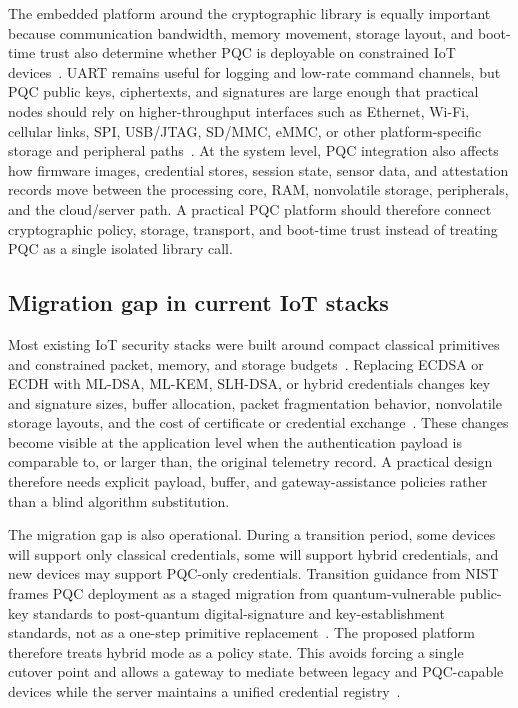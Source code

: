 \documentclass[conference,10pt,letterpaper]{IEEEtran}
\begin{document}
The embedded platform around the cryptographic library is equally important because communication bandwidth, memory movement, storage layout, and boot-time trust also determine whether PQC is deployable on constrained IoT devices~\cite{roma2021,liu2018,schoeffel2021}. UART remains useful for logging and low-rate command channels, but PQC public keys, ciphertexts, and signatures are large enough that practical nodes should rely on higher-throughput interfaces such as Ethernet, Wi-Fi, cellular links, SPI, USB/JTAG, SD/MMC, eMMC, or other platform-specific storage and peripheral paths~\cite{carril2024,mao2023,karl2025,fips203,fips204,fips205}. At the system level, PQC integration also affects how firmware images, credential stores, session state, sensor data, and attestation records move between the processing core, RAM, nonvolatile storage, peripherals, and the cloud/server path. A practical PQC platform should therefore connect cryptographic policy, storage, transport, and boot-time trust instead of treating PQC as a single isolated library call.

\subsection{Migration gap in current IoT stacks}

Most existing IoT security stacks were built around compact classical primitives and constrained packet, memory, and storage budgets~\cite{roma2021,liu2018,schoeffel2021}. Replacing ECDSA or ECDH with ML-DSA, ML-KEM, SLH-DSA, or hybrid credentials changes key and signature sizes, buffer allocation, packet fragmentation behavior, nonvolatile storage layouts, and the cost of certificate or credential exchange~\cite{fips203,fips204,fips205,nistir8547,goertzen2023}. These changes become visible at the application level when the authentication payload is comparable to, or larger than, the original telemetry record. A practical design therefore needs explicit payload, buffer, and gateway-assistance policies rather than a blind algorithm substitution.

The migration gap is also operational. During a transition period, some devices will support only classical credentials, some will support hybrid credentials, and new devices may support PQC-only credentials. Transition guidance from NIST frames PQC deployment as a staged migration from quantum-vulnerable public-key standards to post-quantum digital-signature and key-establishment standards, not as a one-step primitive replacement~\cite{nistir8547}. The proposed platform therefore treats hybrid mode as a policy state. This avoids forcing a single cutover point and allows a gateway to mediate between legacy and PQC-capable devices while the server maintains a unified credential registry~\cite{rfc9964,nistir8547}.
\end{document}
